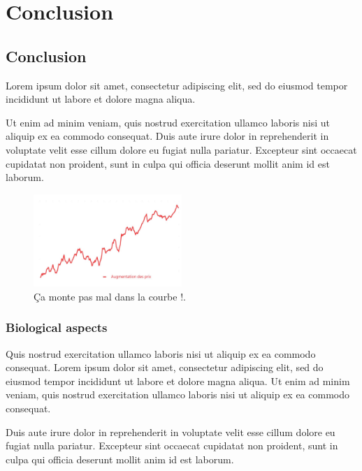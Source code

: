\renewcommand{\chaptername}{Chapter} 
\chapter{Conclusion}\label{chap10}

\section{Conclusion}

Lorem ipsum dolor sit amet, consectetur adipiscing elit, sed do eiusmod tempor incididunt ut labore et dolore magna aliqua. 

Ut enim ad minim veniam, quis nostrud exercitation ullamco laboris nisi ut aliquip ex ea commodo consequat. Duis aute irure dolor in reprehenderit in voluptate velit esse cillum dolore eu fugiat nulla pariatur. Excepteur sint occaecat cupidatat non proident, sunt in culpa qui officia deserunt mollit anim id est laborum.
\begin{figure}[ht!]
    \centering
    \includegraphics[width=0.5\textwidth]{MainLayout/Images/courbe1.jpg}
    \caption{Ça monte pas mal dans la courbe !.}
    \label{fig:courbe-label}
\end{figure}
\subsection {Biological aspects} Quis nostrud exercitation ullamco laboris nisi ut aliquip ex ea commodo consequat. Lorem ipsum dolor sit amet, consectetur adipiscing elit, sed do eiusmod tempor incididunt ut labore et dolore magna aliqua. Ut enim ad minim veniam, quis nostrud exercitation ullamco laboris nisi ut aliquip ex ea commodo consequat. 

Duis aute irure dolor in reprehenderit in voluptate velit esse cillum dolore eu fugiat nulla pariatur. Excepteur sint occaecat cupidatat non proident, sunt in culpa qui officia deserunt mollit anim id est laborum.


